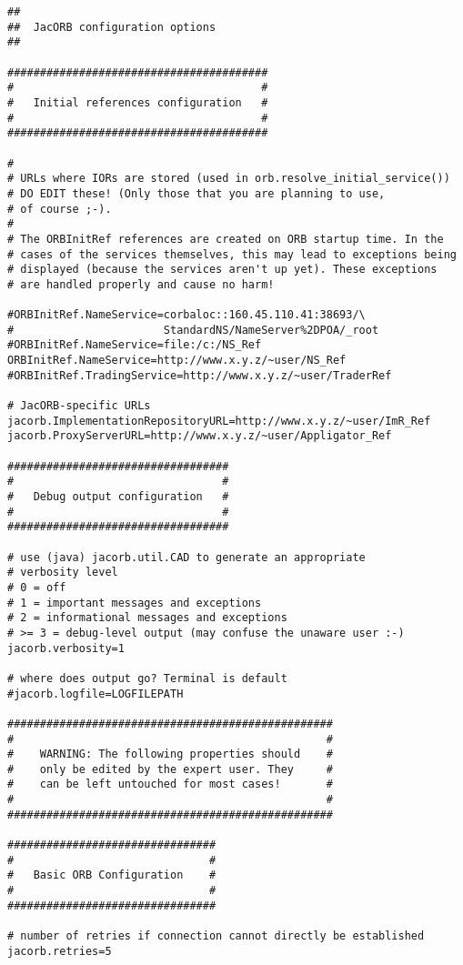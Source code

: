 \documentclass[12pt]{scrbook}
\begin{document}
\renewcommand{\baselinestretch}{0.9}
\small{
\begin{verbatim}
##
##  JacORB configuration options
##

########################################
#                                      #
#   Initial references configuration   #
#                                      #
########################################

#
# URLs where IORs are stored (used in orb.resolve_initial_service())
# DO EDIT these! (Only those that you are planning to use,
# of course ;-).
#
# The ORBInitRef references are created on ORB startup time. In the
# cases of the services themselves, this may lead to exceptions being
# displayed (because the services aren't up yet). These exceptions
# are handled properly and cause no harm!

#ORBInitRef.NameService=corbaloc::160.45.110.41:38693/\
#                       StandardNS/NameServer%2DPOA/_root
#ORBInitRef.NameService=file:/c:/NS_Ref
ORBInitRef.NameService=http://www.x.y.z/~user/NS_Ref
#ORBInitRef.TradingService=http://www.x.y.z/~user/TraderRef

# JacORB-specific URLs
jacorb.ImplementationRepositoryURL=http://www.x.y.z/~user/ImR_Ref
jacorb.ProxyServerURL=http://www.x.y.z/~user/Appligator_Ref

##################################
#                                #
#   Debug output configuration   #
#                                #
##################################

# use (java) jacorb.util.CAD to generate an appropriate
# verbosity level
# 0 = off
# 1 = important messages and exceptions
# 2 = informational messages and exceptions
# >= 3 = debug-level output (may confuse the unaware user :-)
jacorb.verbosity=1

# where does output go? Terminal is default
#jacorb.logfile=LOGFILEPATH

##################################################
#                                                #
#    WARNING: The following properties should    #
#    only be edited by the expert user. They     #
#    can be left untouched for most cases!       #
#                                                #
##################################################

################################
#                              #
#   Basic ORB Configuration    #
#                              #
################################

# number of retries if connection cannot directly be established
jacorb.retries=5


\end{verbatim}}
\end{document}
